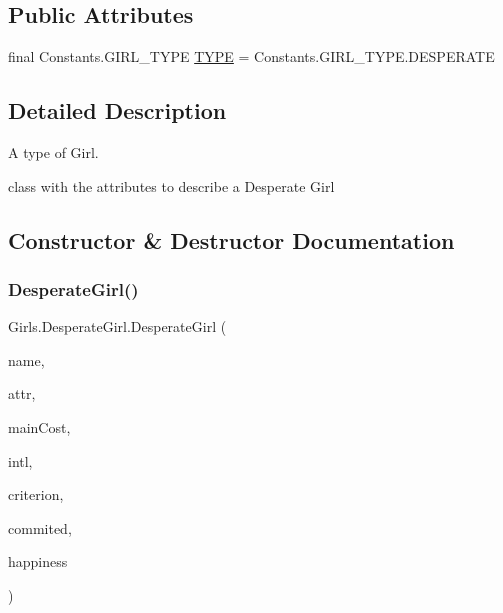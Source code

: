 \subsection*{Public Attributes}
\begin{DoxyCompactItemize}
\item 
final Constants.\+G\+I\+R\+L\+\_\+\+T\+Y\+PE \hyperlink{class_girls_1_1_desperate_girl_a65e9dec8d71a05510f4be3f3fea2f648}{T\+Y\+PE} = Constants.\+G\+I\+R\+L\+\_\+\+T\+Y\+P\+E.\+D\+E\+S\+P\+E\+R\+A\+TE
\end{DoxyCompactItemize}


\subsection{Detailed Description}
A type of Girl. 

class with the attributes to describe a Desperate Girl 

\subsection{Constructor \& Destructor Documentation}
\mbox{\label{class_girls_1_1_desperate_girl_a304398a8ff3cfeed4f9724f5bcbc4df8}} 
\subsubsection{\texorpdfstring{Desperate\+Girl()}{DesperateGirl()}\hspace{0.1cm}{\footnotesize\ttfamily [1/2]}}
{\footnotesize\ttfamily Girls.\+Desperate\+Girl.\+Desperate\+Girl (\begin{DoxyParamCaption}\item[{String}]{name,  }\item[{int}]{attr,  }\item[{int}]{main\+Cost,  }\item[{int}]{intl,  }\item[{Constants.\+C\+R\+I\+T\+E\+R\+I\+ON}]{criterion,  }\item[{boolean}]{commited,  }\item[{double}]{happiness }\end{DoxyParamCaption})\hspace{0.3cm}{\ttfamily [inline]}}


